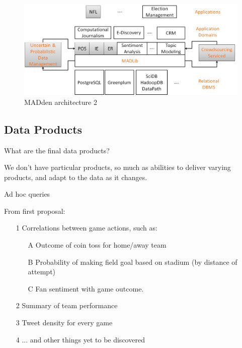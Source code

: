 \documentclass{article}
\newcommand{\system}{MADden\xspace}
\begin{document}
\begin{enumerate}
  \begin{figure}
    \begin{center}
      \includegraphics[scale=0.3]{altarchitecture2.jpg}
      \caption{{\system} architecture 2}
      \label{fig:altarch2}
    \end{center}
  \end{figure}



  \subsection{Data Products}
  What are the final data products?

  We don't have particular products, so much as abilities to deliver varying products, and adapt to the data as it changes.

  Ad hoc queries

  From first proposal:
  \begin{enumerate}
  \item[1] Correlations between game actions, such as:
    \begin{enumerate}
    \item[A] Outcome of coin toss for home/away team
    \item[B] Probability of making field goal based on
      stadium (by distance of attempt)
    \item[C] Fan sentiment with game outcome.
    \end{enumerate}
  \item[2] Summary of team performance
  \item[3] Tweet density for every game
  \item[4] ... and other things yet to be discovered
  \end{enumerate}


\end{enumerate}
\end{document}
